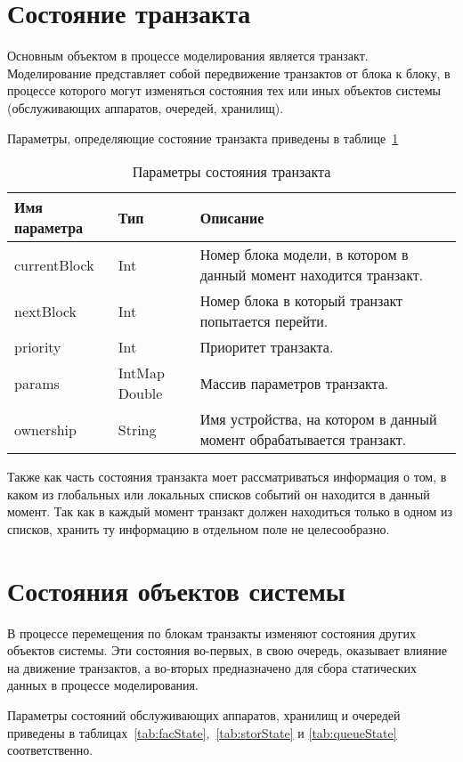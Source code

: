 \section{Состояние транзакта}

Основным объектом в процессе моделирования является транзакт. Моделирование представляет собой передвижение транзактов от блока к блоку, в процессе которого могут изменяться состояния тех или иных объектов системы (обслуживающих аппаратов, очередей, хранилищ).

Параметры, определяющие состояние транзакта приведены в таблице~\ref{tab:transactionState}

\begin{table}
\caption{Параметры состояния транзакта}
\label{tab:transactionState}
\begin{tabular}{|l|l|p{}|}
\hline
Имя параметра & Тип &Описание \\
\hline
currentBlock & Int & Номер блока модели, в котором в данный момент находится транзакт.\\
\hline
nextBlock & Int & Номер блока в который транзакт попытается перейти.\\
\hline
priority & Int & Приоритет транзакта.\\
\hline
params & IntMap Double & Массив параметров транзакта.\\
\hline
ownership & String & Имя устройства, на котором в данный момент обрабатывается транзакт.\\
\hline
\end{tabular}
\end{table}

Также как часть состояния транзакта моет рассматриваться информация о том, в каком из глобальных или локальных списков событий он находится в данный момент. Так как в каждый момент транзакт должен находиться только в одном из списков, хранить ту информацию в отдельном поле не целесообразно.

\section{Состояния объектов системы}

В процессе перемещения по блокам транзакты изменяют состояния других объектов системы. Эти состояния во-первых, в свою очередь, оказывает влияние на движение транзактов, а во-вторых предназначено для сбора статических данных в процессе моделирования.

Параметры состояний обслуживающих аппаратов, хранилищ и очередей приведены в таблицах~\ref{tab:facState},~\ref{tab:storState} и \ref{tab:queueState} соответственно.

